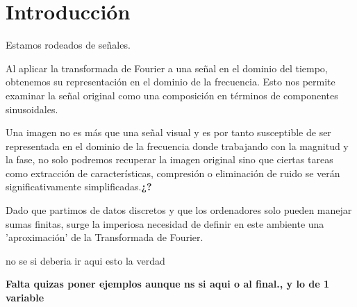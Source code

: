 %


\chapter{Introducción}

Estamos rodeados de señales.

Al aplicar la transformada de Fourier a una señal en el dominio del tiempo, obtenemos su representación en el dominio de la frecuencia. Esto nos permite examinar la señal original como una composición en términos de componentes sinusoidales.

Una imagen no es más que una señal visual y es por tanto susceptible de ser representada en el dominio de la frecuencia donde trabajando con la magnitud y la fase, no solo podremos recuperar la imagen original sino que ciertas tareas como extracción de características, compresión o  eliminación de ruido se verán significativamente simplificadas.\textbf{¿?}

Dado que partimos de datos discretos y que los ordenadores solo pueden manejar sumas finitas, surge la  imperiosa necesidad de definir en este ambiente una 'aproximación' de la Transformada de Fourier.

no se  si deberia ir aqui esto la verdad


\textbf{Falta quizas poner ejemplos aunque ns si aqui o al final., y lo de 1 variable}


\endinput
